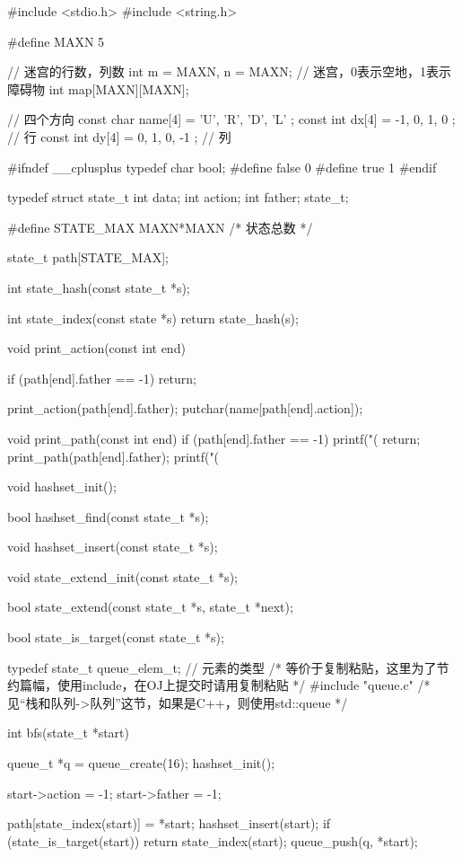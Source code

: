 \begin{Codex}[label=maze.c]
#include <stdio.h>
#include <string.h>

#define MAXN 5

// 迷宫的行数，列数
int m = MAXN, n = MAXN;
// 迷宫，0表示空地，1表示障碍物
int map[MAXN][MAXN];

// 四个方向
const char name[4] = { 'U', 'R', 'D', 'L' };
const int dx[4] = { -1, 0, 1, 0 }; // 行
const int dy[4] = { 0, 1, 0, -1 }; // 列

#ifndef __cplusplus
typedef char bool;
#define false 0
#define true 1
#endif

typedef struct state_t {
    int data;
    int action;
    int father;
} state_t;

#define STATE_MAX MAXN*MAXN  /* 状态总数 */

state_t path[STATE_MAX];

int state_hash(const state_t *s);

int state_index(const state *s) {
    return state_hash(s);
}

void print_action(const int end) {
    if (path[end].father == -1) return;

    print_action(path[end].father);
    putchar(name[path[end].action]);
}

void print_path(const int end) {
    if (path[end].father == -1) {
        printf("(%
        return;
    }
    print_path(path[end].father);
    printf("(%
}

void hashset_init();

bool hashset_find(const state_t *s);

void hashset_insert(const state_t *s);

void state_extend_init(const state_t *s);

bool state_extend(const state_t *s, state_t *next);

bool state_is_target(const state_t *s);

typedef state_t queue_elem_t; // 元素的类型
/* 等价于复制粘贴，这里为了节约篇幅，使用include，在OJ上提交时请用复制粘贴 */
#include "queue.c"  /* 见“栈和队列->队列”这节，如果是C++，则使用std::queue */

int bfs(state_t *start) {
    queue_t *q = queue_create(16);
    hashset_init();

    start->action = -1;
    start->father = -1;

    path[state_index(start)] = *start;
    hashset_insert(start);
    if (state_is_target(start))
        return state_index(start);
    queue_push(q, *start);

}
\end{Codex}
